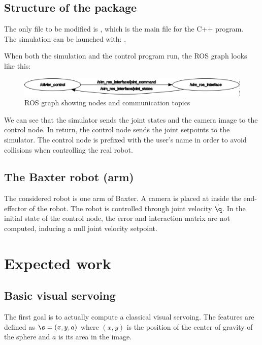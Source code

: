 \documentclass{ecnreport}
\begin{document}
\subsection{Structure of the  package}

The only file to be modified is , which is the main file for the C++ program. \\
The simulation can be launched with: .

When both the simulation and the control program run, the ROS graph looks like this:

\begin{figure}[h!]\centering
 \includegraphics[width=.6\linewidth]{rosgraph}
 \caption{ROS graph showing nodes and communication topics}
 \label{fig:rosgraph}
\end{figure}

We can see that the simulator sends the joint states and the camera image to the control node. In return, the control node sends the joint setpoints
to the simulator. The control node is prefixed with the user's name in order to avoid collisions when controlling the real robot.\\


\subsection{The Baxter robot (arm)}

The considered robot is one arm of Baxter. A camera is placed at inside the end-effector of the robot.
 The robot is controlled through joint velocity $\dot \q$.
 In the initial state of the control node, the error and interaction matrix are not computed, inducing a null joint velocity setpoint.
 
\section{Expected work}

\subsection{Basic visual servoing}

The first goal is to actually compute a classical visual servoing. The features are defined as $\s = (x, y, a)$ where $(x,y)$ is the position of the center of gravity of the sphere and $a$ is its area in the image.
\end{document}
